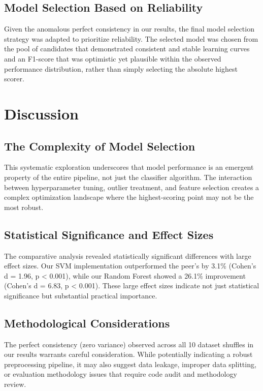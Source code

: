 \documentclass[11pt]{article}
\begin{document}
\subsection{Model Selection Based on Reliability}
Given the anomalous perfect consistency in our results, the final model selection strategy was adapted to prioritize reliability. The selected model was chosen from the pool of candidates that demonstrated consistent and stable learning curves and an F1-score that was optimistic yet plausible within the observed performance distribution, rather than simply selecting the absolute highest scorer.

\section{Discussion}

\subsection{The Complexity of Model Selection}
This systematic exploration underscores that model performance is an emergent property of the entire pipeline, not just the classifier algorithm. The interaction between hyperparameter tuning, outlier treatment, and feature selection creates a complex optimization landscape where the highest-scoring point may not be the most robust.

\subsection{Statistical Significance and Effect Sizes}
The comparative analysis revealed statistically significant differences with large effect sizes. Our SVM implementation outperformed the peer's by 3.1\% (Cohen's d = 1.96, p < 0.001), while our Random Forest showed a 26.1\% improvement (Cohen's d = 6.83, p < 0.001). These large effect sizes indicate not just statistical significance but substantial practical importance.

\subsection{Methodological Considerations}
The perfect consistency (zero variance) observed across all 10 dataset shuffles in our results warrants careful consideration. While potentially indicating a robust preprocessing pipeline, it may also suggest data leakage, improper data splitting, or evaluation methodology issues that require code audit and methodology review.
\end{document}
